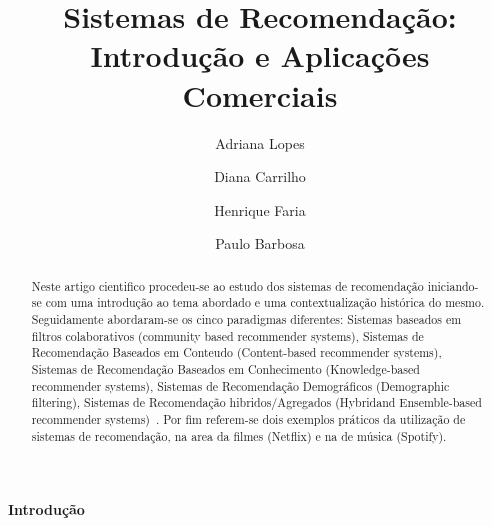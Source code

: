 %
\title{Sistemas de Recomendação: Introdução e Aplicações Comerciais}
%
%
\author{Adriana Lopes \and Diana Carrilho \and Henrique Faria \and Paulo Barbosa}
%
%
%
\maketitle              %
%
\begin{abstract}
Neste artigo cientifico procedeu-se ao estudo dos sistemas de recomendação iniciando-se com uma introdução ao tema abordado e uma contextualização histórica do mesmo. Seguidamente abordaram-se os cinco paradigmas diferentes: Sistemas baseados em filtros colaborativos (community based recommender systems), Sistemas de Recomendação Baseados em Conteudo (Content-based recommender systems), Sistemas de Recomendação Baseados em Conhecimento
(Knowledge-based recommender systems), Sistemas de Recomendação Demográficos (Demographic filtering), Sistemas de Recomendação hibridos/Agregados (Hybridand Ensemble-based recommender systems)~\cite{ref_book1}. Por fim referem-se dois exemplos práticos da utilização de sistemas de recomendação, na area da filmes (Netflix) e na de música (Spotify).\newline

\end{abstract}
%
%
\begin{center}
\normalsize{\bfseries Introdução}\hfill
\end{center}




